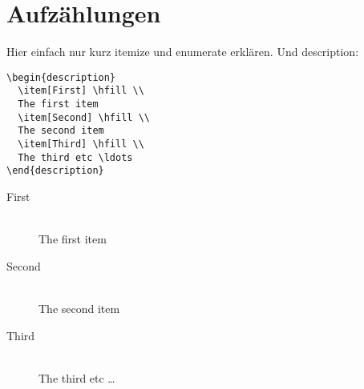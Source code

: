 \documentclass[11pt,a4paper]{scrartcl}
\begin{document}
\section{Aufzählungen}
Hier einfach nur kurz itemize und enumerate erklären. Und description:
\begin{lstlisting}
\begin{description}
  \item[First] \hfill \\
  The first item
  \item[Second] \hfill \\
  The second item
  \item[Third] \hfill \\
  The third etc \ldots
\end{description}
\end{lstlisting}
\begin{description}
  \item[First] \hfill \\
  The first item
  \item[Second] \hfill \\
  The second item
  \item[Third] \hfill \\
  The third etc \ldots
\end{description}
\end{document}
